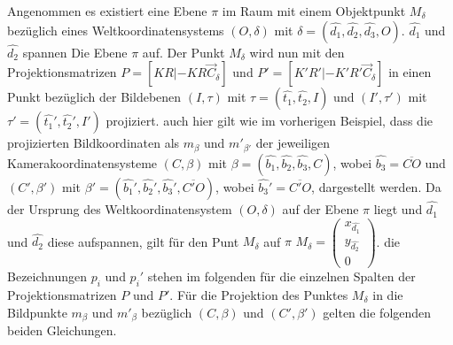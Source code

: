 Angenommen es existiert eine Ebene $\pi$ im Raum mit einem Objektpunkt $M_\delta$ bezüglich eines Weltkoordinatensystems $(O,\delta)$ mit $\delta = (\hat{d_1},\hat{d_2},\hat{d_3},O)$. $\hat{d_1}$ und $\hat{d_2}$ spannen Die Ebene $\pi$ auf. Der Punkt $M_\delta$ wird nun mit den Projektionsmatrizen $P = [KR|-KR\vec{C}_\delta]$ und $P'=	[K'R'|-K'R'\vec{C}_\delta]$ in einen Punkt bezüglich der Bildebenen $(I,\tau)$ mit $\tau = (\hat{t_1}, \hat{t_2},I)$ und $(I',\tau')$ mit $\tau' = (\hat{t_1}', \hat{t_2}',I')$ projiziert. auch hier gilt wie im vorherigen Beispiel, dass die projizierten Bildkoordinaten als $m_\beta$ und $m'_{\beta'}$ der jeweiligen Kamerakoordinatensysteme $(C,\beta)$ mit $\beta = (\hat{b_1},\hat{b_2},\hat{b_3},C)$, wobei $\hat{b_3} = \overline{CO}$ und $(C',\beta')$ mit $\beta' = (\hat{b_1}',\hat{b_2}',\hat{b_3}',\overline{C'O})$, wobei $\hat{b_3}' = \overline{C'O}$, dargestellt werden. Da der Ursprung des Weltkoordinatensystem $(O,\delta)$ auf der Ebene $\pi$ liegt und $\hat{d_1}$ und $\hat{d_2}$ diese aufspannen, gilt für den Punt $M_\delta$ auf $\pi$ $M_\delta = \begin{pmatrix}
x_{\hat{d_1}}\\
y_{\hat{d_2}}\\
0
\end{pmatrix}$. die Bezeichnungen $p_i$ und $p_i'$ stehen im folgenden für die einzelnen Spalten der Projektionsmatrizen $P$ und $P'$. Für die Projektion des Punktes $M_\delta$ in die Bildpunkte  $m_\beta$ und $m'_{\beta}$ bezüglich $(C,\beta)$ und $(C',\beta')$ gelten die folgenden beiden Gleichungen\cite{Elements}.


